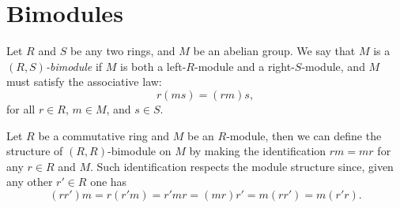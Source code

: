 \section{Bimodules}

\begin{definition}[Bimodule]
\label{def:bimodule}
Let \(R\) and \(S\) be any two rings, and \(M\) be an abelian group. We say that
\(M\) is a \emph{\((R, S)\)-bimodule} if \(M\) is both a left-\(R\)-module and a
right-\(S\)-module, and \(M\) must satisfy the associative law:
\[
r (m s) = (r m) s,
\]
for all \(r \in R\), \(m \in M\), and \(s \in S\).
\end{definition}

\begin{example}
\label{exp:R-commutative-R-R-bimodule}
Let \(R\) be a commutative ring and \(M\) be an \(R\)-module, then we can define
the structure of \((R, R)\)-bimodule on \(M\) by making the identification \(r m
= m r\) for any \(r \in R\) and \(M\). Such identification respects the module
structure since, given any other \(r' \in R\) one has
\[
(r r') m = r (r' m) = r' m r = (m r) r' = m (r r') = m (r' r).
\]
\end{example}

